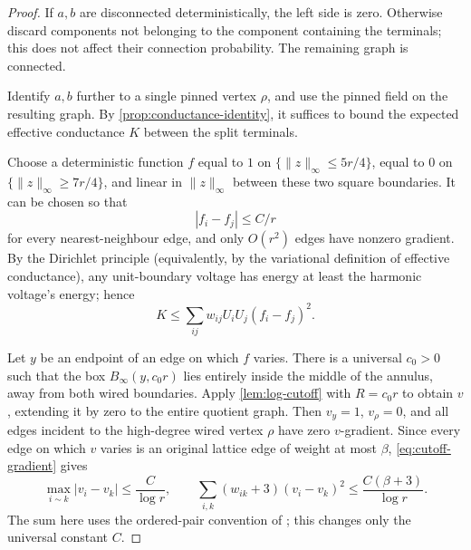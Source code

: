 \documentclass[11pt]{article}
\theoremstyle{definition}
\theoremstyle{remark}
\newcommand{\1}{\mathbf 1}
\begin{document}
\begin{proof}
If $a,b$ are disconnected deterministically, the left side is zero.  Otherwise discard
components not belonging to the component containing the terminals; this does not
affect their connection probability.  The remaining graph is connected.

Identify $a,b$ further to a single pinned vertex $\rho$, and use the pinned field on
the resulting graph.  By \cref{prop:conductance-identity}, it suffices to bound the
expected effective conductance $K$ between the split terminals.

Choose a deterministic function $f$ equal to $1$ on
$\{\|z\|_\infty\le5r/4\}$, equal to $0$ on
$\{\|z\|_\infty\ge7r/4\}$, and linear in $\|z\|_\infty$ between these two square
boundaries.  It can be chosen so that
\begin{equation}\label{eq:f-grad}
 |f_i-f_j|\le C/r
\end{equation}
for every nearest-neighbour edge, and only $O(r^2)$ edges have nonzero gradient.
By the Dirichlet principle (equivalently, by the variational definition of effective
conductance), any unit-boundary voltage has energy at least the harmonic voltage's
energy; hence
\begin{equation}\label{eq:Dirichlet-K}
 K\le\sum_{ij}w_{ij}U_iU_j(f_i-f_j)^2.
\end{equation}

Let $y$ be an endpoint of an edge on which $f$ varies.  There is a universal
$c_0>0$ such that the box $B_\infty(y,c_0r)$ lies entirely inside the middle of the
annulus, away from both wired boundaries.  Apply \cref{lem:log-cutoff} with
$R=c_0r$ to obtain $v$, extending it by zero to the entire quotient graph.  Then
$v_y=1$, $v_\rho=0$, and all edges incident to the high-degree wired vertex $\rho$
have zero $v$-gradient.  Since every edge on which $v$ varies is an original lattice
edge of weight at most $\beta$, \eqref{eq:cutoff-gradient} gives
\begin{equation}\label{eq:weighted-cutoff-energy}
 \max_{i\sim k}|v_i-v_k|\le\frac{C}{\log r},
 \qquad
 \sum_{i,k}(w_{ik}+3)(v_i-v_k)^2
 \le\frac{C(\beta+3)}{\log r}.
\end{equation}
The sum here uses the ordered-pair convention of \cite{BCHS}; this changes only the universal
constant $C$.


\end{proof}
\end{document}
